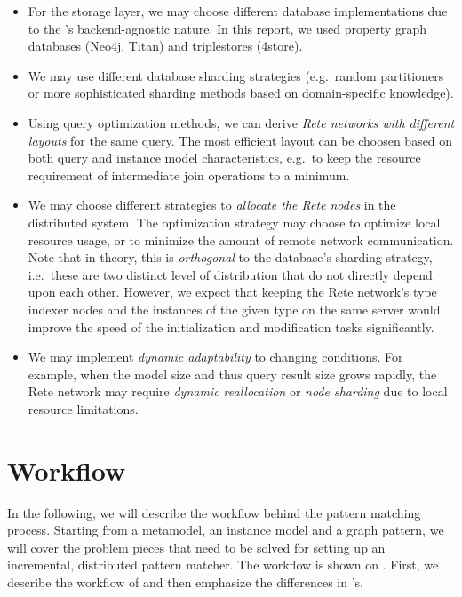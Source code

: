\begin{itemize}
  \item For the storage layer, we may choose different database implementations due to the \iqd{}'s backend-agnostic nature. In this report, we used property graph databases (Neo4j, Titan) and triplestores (4store).
  \item We may use different database sharding strategies (e.g.\ random partitioners or more sophisticated sharding methods based on domain-specific knowledge).
  \item Using query optimization methods, we can derive \emph{Rete networks with different layouts} for the same query. The most efficient layout can be choosen based on both query and instance model characteristics, e.g.\ to keep the resource requirement of intermediate join operations to a minimum.
  \item We may choose different strategies to \emph{allocate the Rete nodes} in the distributed system. The optimization strategy may choose to optimize local resource usage, or to minimize the amount of remote network communication. Note that in theory, this is \emph{orthogonal} to the database's sharding strategy, i.e.\ these are two distinct level of distribution that do not directly depend upon each other. However, we expect that keeping the Rete network's type indexer nodes and the instances of the given type on the same server would improve the speed of the initialization and modification tasks significantly.
  \item We may implement \emph{dynamic adaptability} to changing conditions. For example, when the model size and thus query result size grows rapidly, the Rete network may require \emph{dynamic reallocation} or \emph{node sharding} due to local resource limitations.
\end{itemize}




\section{Workflow}
\label{workflow}


In the following, we will describe the workflow behind the pattern matching process. Starting from a metamodel, an instance model and a graph pattern, we will cover the problem pieces that need to be solved for setting up an incremental, distributed pattern matcher. The workflow is shown on . First, we describe the workflow of \eiq{} and then emphasize the differences in \iqd{}'s.

